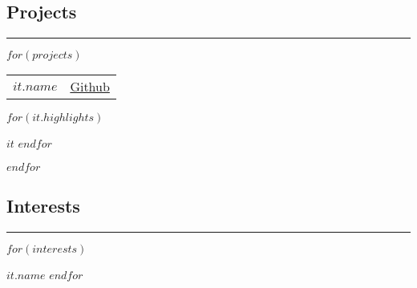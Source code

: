 \documentclass[10pt,letterpaper]{article}
\makeatletter
\def\sectionSpace{\vspace{-10pt}}
\newcommand\resumesection[1]
{\subsection*{#1}
\vspace{-0.2em}
\hrule
\vspace{0.4em}}
\newcommand\headerrow[2]
{\begin{tabular*}{\linewidth}{l@{\extracolsep{\fill}}r}
    #1 &
	#2 \\
\end{tabular*}}
\makeatother
\begin{document}
\resumesection{Projects}

    $for(projects)$
    \headerrow
		{\textbf{$it.name$}}
        {\href{$it.url$}{Github}}
    \vspace{-16pt}
	\begin{itemize*}
        $for(it.highlights)$
	    \item $it$
        $endfor$
	\end{itemize*}
	\vspace{-2pt}
    $endfor$
	\sectionSpace

\resumesection{Interests}

    \begin{itemize*}
        $for(interests)$
        \item $it.name$
        $endfor$
    \end{itemize*}
\end{document}
